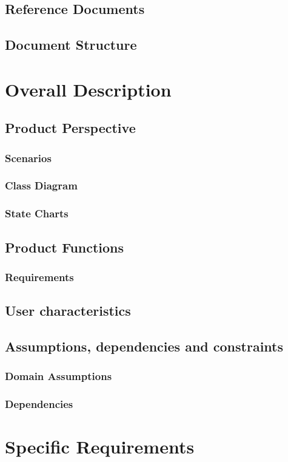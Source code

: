 \documentclass{article}
\begin{document}
\subsection{Reference Documents}
\subsection{Document Structure}

\section{Overall Description}
\subsection{Product Perspective}
\subsubsection{Scenarios}
\subsubsection{Class Diagram}
\subsubsection{State Charts}
\subsection{Product Functions}
\subsubsection{Requirements}
\subsection{User characteristics}
\subsection{Assumptions, dependencies and constraints}
\subsubsection{Domain Assumptions}
\subsubsection{Dependencies}


\section{Specific Requirements}
\end{document}
